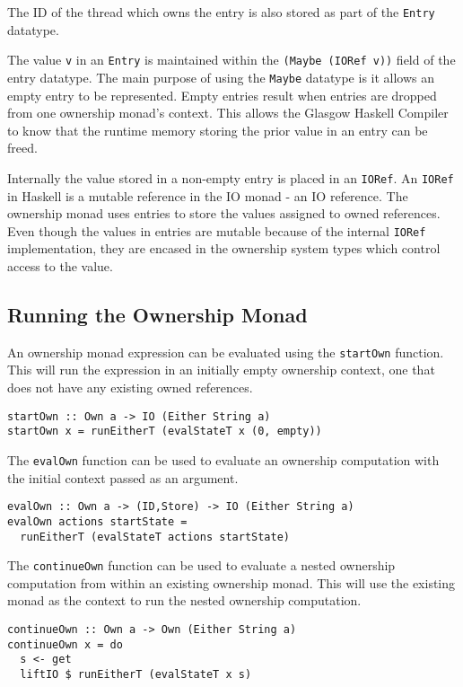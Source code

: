 \documentclass[onehalf,11pt]{beavtex}
\begin{document}
The ID of the thread which owns the entry is also stored as part of the
\texttt{Entry} datatype. 

The value \texttt{v} in an \texttt{Entry} is maintained within the
\texttt{(Maybe (IORef v))} field of the entry datatype.
The main purpose of using the \texttt{Maybe} datatype is it allows an empty entry
to be represented.
Empty entries result when entries are dropped from one ownership monad's
context.  This allows the Glasgow Haskell Compiler to know that
the runtime memory storing the prior value in an entry can be freed.

Internally the value stored in a non-empty entry is placed in an \texttt{IORef}.
An \texttt{IORef} in Haskell is a mutable reference in the IO monad - an IO
reference. %
The ownership monad uses entries to store the values assigned to owned
references.
Even though the values in entries are mutable because of the internal \texttt{IORef}
implementation, they are encased in the ownership system types which control
access to the value.

\subsection{Running the Ownership Monad}

An ownership monad expression can be evaluated using the \texttt{startOwn}
function. This will run the expression in an initially empty ownership context,
one that does not have any existing owned references. 

\begin{verbatim}
startOwn :: Own a -> IO (Either String a)
startOwn x = runEitherT (evalStateT x (0, empty))
\end{verbatim}

The \texttt{evalOwn} function can be used to evaluate an ownership computation
with the initial context passed as an argument.

\begin{verbatim}
evalOwn :: Own a -> (ID,Store) -> IO (Either String a)
evalOwn actions startState =
  runEitherT (evalStateT actions startState)
\end{verbatim}

The \texttt{continueOwn} function can be used to evaluate a nested ownership
computation from within an existing ownership monad.  This will use the
existing monad as the context to run the nested ownership computation. 

\begin{verbatim}
continueOwn :: Own a -> Own (Either String a)
continueOwn x = do
  s <- get
  liftIO $ runEitherT (evalStateT x s)
\end{verbatim}
\end{document}
